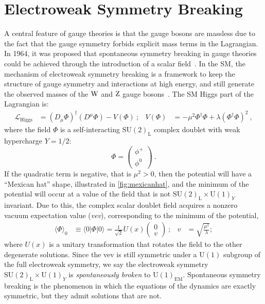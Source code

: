 \section{Electroweak Symmetry Breaking}
A central feature of gauge theories is that the gauge bosons are
massless due to the fact that the gauge symmetry forbids explicit mass
terms in the Lagrangian. In 1964, it was proposed that spontaneous symmetry breaking in gauge
theories could be achieved through the introduction of a scalar
field~\cite{PhysRevLett.13.321,HIGGS1964132,PhysRevLett.13.508,PhysRevLett.13.585,PhysRev.145.1156,PhysRev.155.1554}. In
the SM, the mechanism of electroweak symmetry breaking
is a framework to keep the structure of gauge symmetry and
interactions at high energy, and still generate the observed masses
of the $\mathrm{W}$ and $\mathrm{Z}$ gauge
bosons~\cite{PhysRevLett.19.1264,GLASHOW1961579,Salam:1968rm}. The SM
Higgs part of the Lagrangian is: 
\begin{align}
\mathcal L_{\mathrm{Higgs}} &= (D_{\mu}\Phi)^{\dagger}(D^{\mu}\Phi) -
V(\Phi)~;& V(\Phi) &= -\mu^2\Phi^{\dagger}\Phi +
\lambda(\Phi^{\dagger}\Phi)^2~,
\label{eqn:Lhiggs}
\end{align}
where the field $\Phi$ is a self-interacting
$\mathrm{SU(2)}_{\mathrm{L}}$ complex doublet with weak hypercharge $Y=1/2$:
\begin{equation}
\Phi = \left(\begin{matrix} \phi^{+}\\\phi^0\end{matrix} \right)~.
\end{equation}
If the quadratic term is negative, that is $\mu^2>0$, then the
potential will have a ``Mexican hat'' shape, illustrated in
\ref{fig:mexicanhat}, and the minimum of the potential will occur at a value of the field that is not $\mathrm{SU(2)}_{\mathrm{L}}\times\mathrm{U(1)}_Y$
invariant. Due to this, the complex scalar doublet field acquires a nonzero vacuum
expectation value (\emph{vev}), corresponding to the minimum of the potential,
\begin{align}
\langle\Phi\rangle_0&\equiv \langle 0|\Phi|0\rangle =
\frac{1}{\sqrt{2}}U(x)\left(\begin{matrix} 0\\v\end{matrix} \right)~;&v &= \sqrt{\frac{\mu^2}{\lambda}};
\end{align}
where $U(x)$ is a unitary transformation that rotates the field
to the other degenerate solutions. Since the vev is still symmetric under a $\mathrm{U(1)}$ subgroup of the full
electroweak symmetry, we say the electroweak symmetry
$\mathrm{SU(2)}_{\mathrm{L}}\times\mathrm{U(1)}_Y$ is \emph{spontaneously
broken} to $\mathrm{U(1)}_{\mathrm{EM}}$. Spontaneous symmetry breaking
is the phenomenon in which the equations of the dynamics are
exactly symmetric, but they admit solutions that are not.

